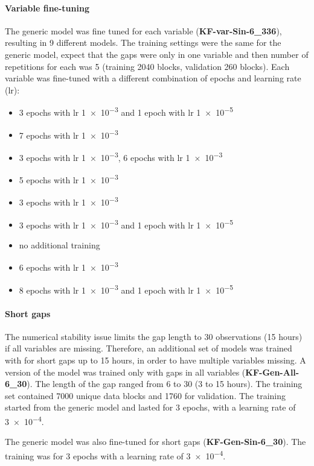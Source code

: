 \documentclass{article}
\begin{document}
\paragraph{Variable fine-tuning} The generic model was fine tuned for each variable (\textbf{KF-\textlangle var\textrangle-Sin-6\_336}), resulting in 9 different models. The training settings were the same for the generic model, expect that the gaps were only in one variable and then number of repetitions for each was 5 (training 2040 blocks, validation 260 blocks). Each variable was fine-tuned with a different combination of epochs and learning rate (lr):
\begin{itemize}
    \item {} 3 epochs with lr \num{1e-3} and 1 epoch with lr \num{1e-5}
    \item {} \num{7} epochs with lr \num{1e-3}
    \item {} \num{3} epochs with lr \num{1e-3},  \num{6} epochs with lr \num{1e-3}
    \item {} \num{5} epochs with lr \num{1e-3}
    \item {} \num{3} epochs with lr \num{1e-3}
    \item {} \num{3} epochs with lr \num{1e-3} and 1 epoch with lr \num{1e-5}
    \item {} no additional training
    \item  {} \num{6} epochs with lr \num{1e-3}
    \item {} \num{8} epochs with lr \num{1e-3} and 1 epoch with lr \num{1e-5}
\end{itemize}

\paragraph{Short gaps} The numerical stability issue limits the gap length to 30 observations (15 hours) if all variables are missing. Therefore, an additional set of models was trained with for short gaps up to 15 hours, in order to have multiple variables missing.
A version of the model was trained only with gaps in all variables (\textbf{KF-Gen-All-6\_30}). The length of the gap ranged from 6 to 30 (3 to 15 hours). The training set contained 7000 unique data blocks and 1760 for validation. The training started from the generic model and lasted for 3 epochs, with a learning rate of \num{3e-4}.

The generic model was also fine-tuned for short gaps (\textbf{KF-Gen-Sin-6\_30}). The training was for 3 epochs with a learning rate of \num{3e-4}.
\end{document}
